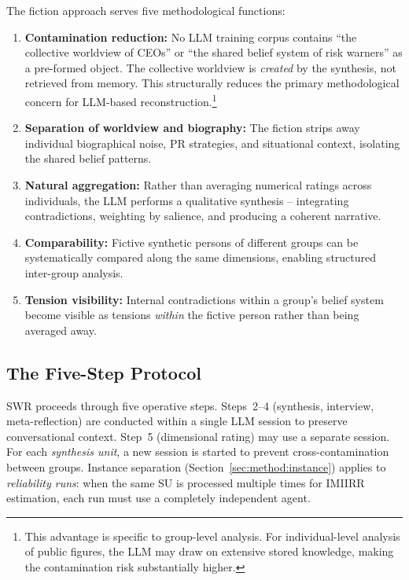 \documentclass[11pt,a4paper]{article}
\begin{document}
The fiction approach serves five methodological functions:

\begin{enumerate}[nosep]
  \item \textbf{Contamination reduction:} No LLM training corpus contains ``the collective worldview of CEOs'' or ``the shared belief system of risk warners'' as a pre-formed object. The collective worldview is \emph{created} by the synthesis, not retrieved from memory. This structurally reduces the primary methodological concern for LLM-based reconstruction.\footnote{This advantage is specific to group-level analysis. For individual-level analysis of public figures, the LLM may draw on extensive stored knowledge, making the contamination risk substantially higher.}
  \item \textbf{Separation of worldview and biography:} The fiction strips away individual biographical noise, PR strategies, and situational context, isolating the shared belief patterns.
  \item \textbf{Natural aggregation:} Rather than averaging numerical ratings across individuals, the LLM performs a qualitative synthesis -- integrating contradictions, weighting by salience, and producing a coherent narrative.
  \item \textbf{Comparability:} Fictive synthetic persons of different groups can be systematically compared along the same dimensions, enabling structured inter-group analysis.
  \item \textbf{Tension visibility:} Internal contradictions within a group's belief system become visible as tensions \emph{within} the fictive person rather than being averaged away.
\end{enumerate}


\subsection{The Five-Step Protocol}
\label{sec:method:protocol}

SWR proceeds through five operative steps. Steps~2--4 (synthesis, interview, meta-reflection) are conducted within a single LLM session to preserve conversational context. Step~5 (dimensional rating) may use a separate session. For each \emph{synthesis unit}, a new session is started to prevent cross-contamination between groups. Instance separation (Section~\ref{sec:method:instance}) applies to \emph{reliability runs}: when the same SU is processed multiple times for IMIIRR estimation, each run must use a completely independent agent.
\end{document}
